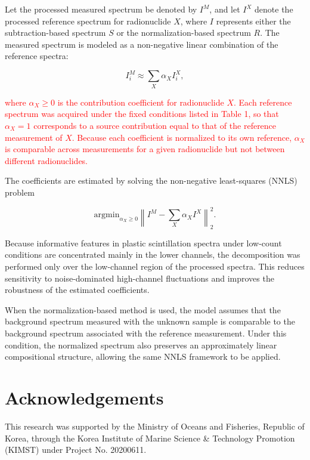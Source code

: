 \documentclass[pdflatex,sn-mathphys-num, table]{sn-jnl}%
\theoremstyle{thmstyleone}%
\theoremstyle{thmstyletwo}%
\theoremstyle{thmstylethree}%
\begin{document}
Let the processed measured spectrum be denoted by $I^M$, and let $I^X$ denote the processed reference spectrum for radionuclide $X$, where $I$ represents either the subtraction-based spectrum $S$ or the normalization-based spectrum $R$. The measured spectrum is modeled as a non-negative linear combination of the reference spectra:

\begin{equation}
I^M_i \approx \sum_X \alpha_X I_i^X,
\end{equation}

\noindent\textcolor{red}{where $\alpha_X \ge 0$ is the contribution coefficient for radionuclide $X$.  Each reference spectrum was acquired under the fixed conditions listed in Table 1, so that $\alpha_X=1$ corresponds to a source contribution equal to that of the reference measurement of $X$. Because each coefficient is normalized to its own reference, $\alpha_X$ is comparable across measurements for a given radionuclide but not between different radionuclides.}

The coefficients are estimated by solving the non-negative least-squares (NNLS) problem

\begin{equation}
\text{argmin}_{\alpha_X \ge 0} \left\| I^M - \sum_X \alpha_X I^X \right\|^2_2.
\end{equation}

Because informative features in plastic scintillation spectra under low-count conditions are concentrated mainly in the lower channels, the decomposition was performed only over the low-channel region of the processed spectra. This reduces sensitivity to noise-dominated high-channel fluctuations and improves the robustness of the estimated coefficients. 

When the normalization-based method is used, the model assumes that the background spectrum measured with the unknown sample is comparable to the background spectrum associated with the reference measurement. Under this condition, the normalized spectrum also preserves an approximately linear compositional structure, allowing the same NNLS framework to be applied.

\section*{Acknowledgements}

This research was supported by the Ministry of Oceans and Fisheries, Republic of Korea, through the Korea Institute of Marine Science \& Technology Promotion (KIMST) under Project No. 20200611.
\end{document}
